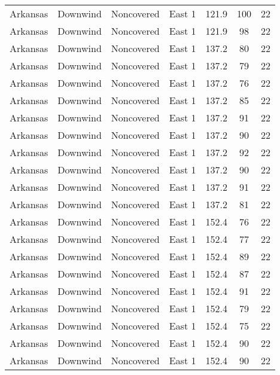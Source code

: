 \documentclass{article}
\begin{document}
\begin{longtable}[H]{ccccccc}
Arkansas & Downwind  & Noncovered & East 1        & 121.9        & 100         & 22  \\
Arkansas & Downwind  & Noncovered & East 1        & 121.9        & 98          & 22  \\
Arkansas & Downwind  & Noncovered & East 1        & 137.2        & 80          & 22  \\
Arkansas & Downwind  & Noncovered & East 1        & 137.2        & 79          & 22  \\
Arkansas & Downwind  & Noncovered & East 1        & 137.2        & 76          & 22  \\
Arkansas & Downwind  & Noncovered & East 1        & 137.2        & 85          & 22  \\
Arkansas & Downwind  & Noncovered & East 1        & 137.2        & 91          & 22  \\
Arkansas & Downwind  & Noncovered & East 1        & 137.2        & 90          & 22  \\
Arkansas & Downwind  & Noncovered & East 1        & 137.2        & 92          & 22  \\
Arkansas & Downwind  & Noncovered & East 1        & 137.2        & 90          & 22  \\
Arkansas & Downwind  & Noncovered & East 1        & 137.2        & 91          & 22  \\
Arkansas & Downwind  & Noncovered & East 1        & 137.2        & 81          & 22  \\
Arkansas & Downwind  & Noncovered & East 1        & 152.4        & 76          & 22  \\
Arkansas & Downwind  & Noncovered & East 1        & 152.4        & 77          & 22  \\
Arkansas & Downwind  & Noncovered & East 1        & 152.4        & 89          & 22  \\
Arkansas & Downwind  & Noncovered & East 1        & 152.4        & 87          & 22  \\
Arkansas & Downwind  & Noncovered & East 1        & 152.4        & 91          & 22  \\
Arkansas & Downwind  & Noncovered & East 1        & 152.4        & 79          & 22  \\
Arkansas & Downwind  & Noncovered & East 1        & 152.4        & 75          & 22  \\
Arkansas & Downwind  & Noncovered & East 1        & 152.4        & 90          & 22  \\
Arkansas & Downwind  & Noncovered & East 1        & 152.4        & 90          & 22  \\

\end{longtable}
\end{document}
